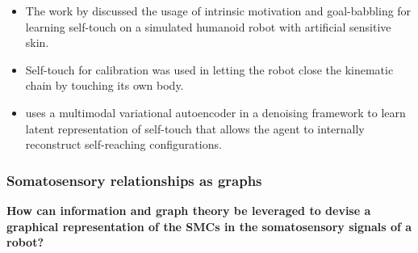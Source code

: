 \begin{itemize}
	\item The work by \cite{Gama2021Goaldirectedtactile} discussed the usage of intrinsic motivation and goal-babbling for learning self-touch on a simulated humanoid robot with artificial sensitive skin.
	\item Self-touch for calibration was used in \cite{Roncone2014Automatickinematicchain} letting the robot close the kinematic chain by touching its own body.
	\item \cite{Marcel2022Learningreachown} uses a multimodal variational autoencoder in a denoising framework to learn latent representation of self-touch that allows the agent to internally reconstruct self-reaching configurations. 
\end{itemize}








\subsubsection{Somatosensory relationships as graphs}

	\textbf{How can information and graph theory be leveraged to devise a graphical representation of the SMCs in the somatosensory signals of a robot?}~\label{q4}

